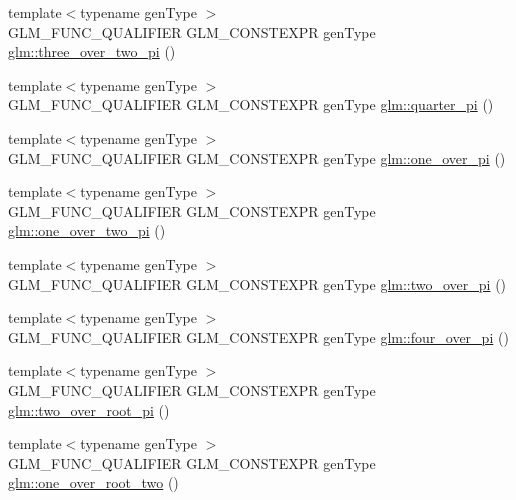 \begin{DoxyCompactItemize}
{\footnotesize template$<$typename gen\+Type $>$ }\\G\+L\+M\+\_\+\+F\+U\+N\+C\+\_\+\+Q\+U\+A\+L\+I\+F\+I\+ER G\+L\+M\+\_\+\+C\+O\+N\+S\+T\+E\+X\+PR gen\+Type \hyperlink{group__gtc__constants_gae94950df74b0ce382b1fc1d978ef7394}{glm\+::three\+\_\+over\+\_\+two\+\_\+pi} ()
\item 
{\footnotesize template$<$typename gen\+Type $>$ }\\G\+L\+M\+\_\+\+F\+U\+N\+C\+\_\+\+Q\+U\+A\+L\+I\+F\+I\+ER G\+L\+M\+\_\+\+C\+O\+N\+S\+T\+E\+X\+PR gen\+Type \hyperlink{group__gtc__constants_ga3c9df42bd73c519a995c43f0f99e77e0}{glm\+::quarter\+\_\+pi} ()
\item 
{\footnotesize template$<$typename gen\+Type $>$ }\\G\+L\+M\+\_\+\+F\+U\+N\+C\+\_\+\+Q\+U\+A\+L\+I\+F\+I\+ER G\+L\+M\+\_\+\+C\+O\+N\+S\+T\+E\+X\+PR gen\+Type \hyperlink{group__gtc__constants_ga555150da2b06d23c8738981d5013e0eb}{glm\+::one\+\_\+over\+\_\+pi} ()
\item 
{\footnotesize template$<$typename gen\+Type $>$ }\\G\+L\+M\+\_\+\+F\+U\+N\+C\+\_\+\+Q\+U\+A\+L\+I\+F\+I\+ER G\+L\+M\+\_\+\+C\+O\+N\+S\+T\+E\+X\+PR gen\+Type \hyperlink{group__gtc__constants_ga7c922b427986cbb2e4c6ac69874eefbc}{glm\+::one\+\_\+over\+\_\+two\+\_\+pi} ()
\item 
{\footnotesize template$<$typename gen\+Type $>$ }\\G\+L\+M\+\_\+\+F\+U\+N\+C\+\_\+\+Q\+U\+A\+L\+I\+F\+I\+ER G\+L\+M\+\_\+\+C\+O\+N\+S\+T\+E\+X\+PR gen\+Type \hyperlink{group__gtc__constants_ga74eadc8a211253079683219a3ea0462a}{glm\+::two\+\_\+over\+\_\+pi} ()
\item 
{\footnotesize template$<$typename gen\+Type $>$ }\\G\+L\+M\+\_\+\+F\+U\+N\+C\+\_\+\+Q\+U\+A\+L\+I\+F\+I\+ER G\+L\+M\+\_\+\+C\+O\+N\+S\+T\+E\+X\+PR gen\+Type \hyperlink{group__gtc__constants_ga753950e5140e4ea6a88e4a18ba61dc09}{glm\+::four\+\_\+over\+\_\+pi} ()
\item 
{\footnotesize template$<$typename gen\+Type $>$ }\\G\+L\+M\+\_\+\+F\+U\+N\+C\+\_\+\+Q\+U\+A\+L\+I\+F\+I\+ER G\+L\+M\+\_\+\+C\+O\+N\+S\+T\+E\+X\+PR gen\+Type \hyperlink{group__gtc__constants_ga5827301817640843cf02026a8d493894}{glm\+::two\+\_\+over\+\_\+root\+\_\+pi} ()
\item 
{\footnotesize template$<$typename gen\+Type $>$ }\\G\+L\+M\+\_\+\+F\+U\+N\+C\+\_\+\+Q\+U\+A\+L\+I\+F\+I\+ER G\+L\+M\+\_\+\+C\+O\+N\+S\+T\+E\+X\+PR gen\+Type \hyperlink{group__gtc__constants_ga788fa23a0939bac4d1d0205fb4f35818}{glm\+::one\+\_\+over\+\_\+root\+\_\+two} ()

\end{DoxyCompactItemize}
